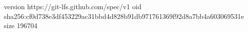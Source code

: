 version https://git-lfs.github.com/spec/v1
oid sha256:cf0d738e3df453229ac31bbd4d828b91db971761369f92d8a7bb4a603069531e
size 196704

